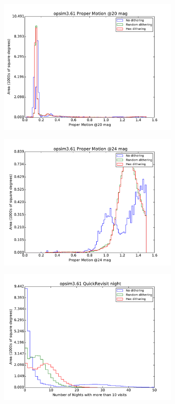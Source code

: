\documentclass[]{spie}  %
\begin{document}
\begin{figure}
\begin{subfigure}[]{0.3\textwidth}
\centering
\includegraphics[width=.8\textwidth]{figures/opsim3_61__opsim3_61_Proper_Motion_@20_mag_HEAL_Histogram}
\caption[]{}
\label{subfig:pm20hist}
\end{subfigure}
\begin{subfigure}[]{0.3\textwidth}
\centering
\includegraphics[width=.8\textwidth]{figures/opsim3_61__opsim3_61_Proper_Motion_@24_mag_HEAL_Histogram}
\caption[]{}
\label{subfig:pm24hist}
\end{subfigure}
\begin{subfigure}[]{0.3\textwidth}
\centering
\includegraphics[width=.8\textwidth]{figures/opsim3_61__opsim3_61_QuickRevisit_night_HEAL_Histogram}

\end{subfigure}
\end{figure}
\end{document}
